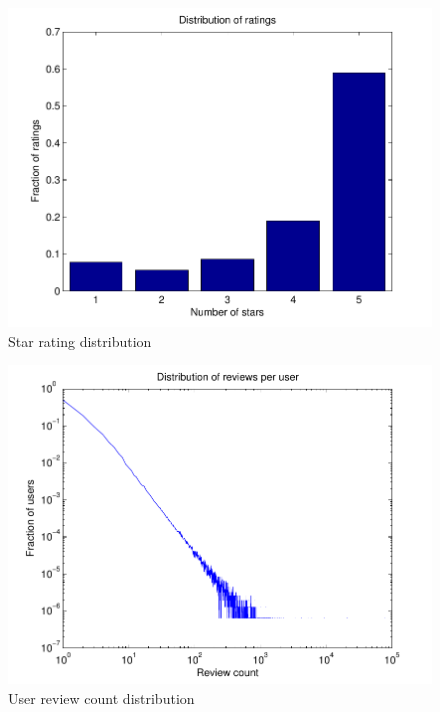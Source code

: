 \documentclass[letterpaper, 10 pt, twocolumn]{article}
\begin{document}
\begin{figure}[h]
\includegraphics[scale=0.6]{images/ratings.pdf}
\caption{Star rating distribution}
\label{fig:ratings}
\end{figure}

\begin{figure}[h]
\includegraphics[scale=0.6]{images/user_hist.pdf}
\caption{User review count distribution}
\label{fig:userhist}
\end{figure}
\end{document}
